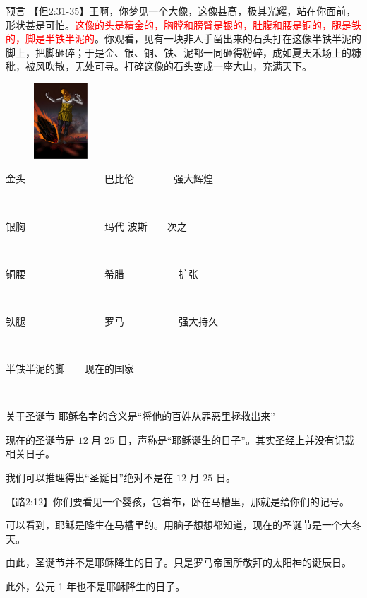 \documentclass[UTF8]{ctexbeamer}
\begin{document}
	\begin{frame}{预言}
		【但2:31-35】王啊，你梦见一个大像，这像甚高，极其光耀，站在你面前，形状甚是可怕。\textcolor{red}{这像的头是精金的，胸膛和膀臂是银的，肚腹和腰是铜的，腿是铁的，脚是半铁半泥的}。你观看，见有一块非人手凿出来的石头打在这像半铁半泥的脚上，把脚砸碎；于是金、银、铜、铁、泥都一同砸得粉碎，成如夏天禾场上的糠秕，被风吹散，无处可寻。打碎这像的石头变成一座大山，充满天下。
		\pause
		\begin{figure}
			\includegraphics[width=2cm]{picture/6.png}
		\end{figure}
		\pause
		金头~~~~~~~~~~~~~~~~巴比伦~~~~~~~~强大辉煌\par
		~\par
		\pause
		银胸~~~~~~~~~~~~~~~~玛代-波斯~~~~次之\par
		~\par
		\pause
		铜腰~~~~~~~~~~~~~~~~希腊~~~~~~~~~~~扩张\par
		~\par
		\pause
		铁腿~~~~~~~~~~~~~~~~罗马~~~~~~~~~~~强大持久\par
		~\par
		\pause
		半铁半泥的脚~~~~现在的国家\par 
		~\par
	\end{frame}
	\begin{frame}{关于圣诞节}
		耶稣名字的含义是“将他的百姓从罪恶里拯救出来”\par\pause
		现在的圣诞节是 $12$ 月 $25$ 日，声称是“耶稣诞生的日子”。其实圣经上并没有记载相关日子。\par\pause
		我们可以推理得出“圣诞日”绝对不是在 $12$ 月 $25$ 日。\par\pause
		【路2:12】你们要看见一个婴孩，包着布，卧在马槽里，那就是给你们的记号。\par\pause
		可以看到，耶稣是降生在马槽里的。\pause 用脑子想想都知道，现在的圣诞节是一个大冬天。\par\pause
		由此，圣诞节并不是耶稣降生的日子。只是罗马帝国所敬拜的太阳神的诞辰日。\par\pause
		此外，公元 1 年也不是耶稣降生的日子。\par
	\end{frame}
\end{document}
